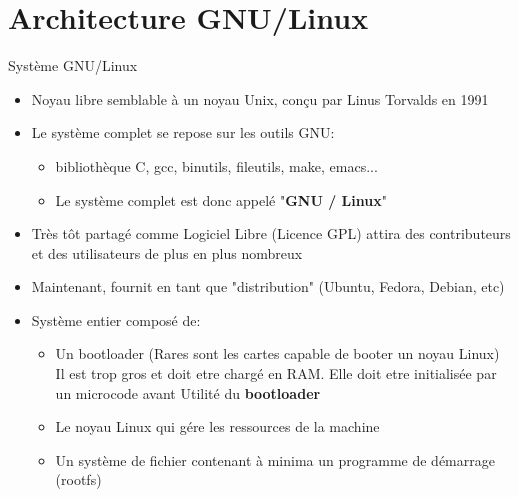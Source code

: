 \section{Architecture GNU/Linux}

\begin{frame}{Système GNU/Linux}{}
  \begin{itemize}
  \item Noyau libre semblable à un noyau Unix, conçu par Linus Torvalds en 1991
  \item Le système complet se repose sur les outils GNU:
    \begin{itemize}
    \item bibliothèque C, gcc, binutils, fileutils, make, emacs...
    \item Le système complet est donc appelé "\textbf{GNU / Linux}"
    \end{itemize}
  \item Très tôt partagé comme Logiciel Libre (Licence GPL) \MVRightarrow attira des contributeurs et des utilisateurs de plus en plus nombreux
  \item Maintenant, fournit en tant que "distribution" (Ubuntu, Fedora, Debian, etc)
  \item Système entier composé de:
    \begin{itemize}
    \item Un bootloader (Rares sont les cartes capable de booter un noyau Linux)\\
      Il est trop gros et doit etre chargé en RAM. Elle doit etre initialisée par un microcode avant \MVRightarrow{} Utilité du \textbf{bootloader}
    \item Le noyau Linux qui gére les ressources de la machine
    \item Un système de fichier contenant à minima un programme de démarrage (rootfs)
    \end{itemize}
  \end{itemize}
\end{frame}

